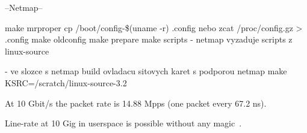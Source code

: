--Netmap--

make mrproper
cp /boot/config-\$(uname -r) .config   nebo  zcat /proc/config.gz > .config
make oldconfig
make prepare
make scripts - netmap vyzaduje scripts z linux-source


- ve slozce s netmap build ovladacu sitovych karet s podporou netmap
make KSRC=/scratch/linux-source-3.2


At 10 Gbit/s the packet rate is 14.88 Mpps (one packet every 67.2 ns).

Line-rate at 10 Gig in userspace is possible without any magic~\cite{netmap-slides}.

